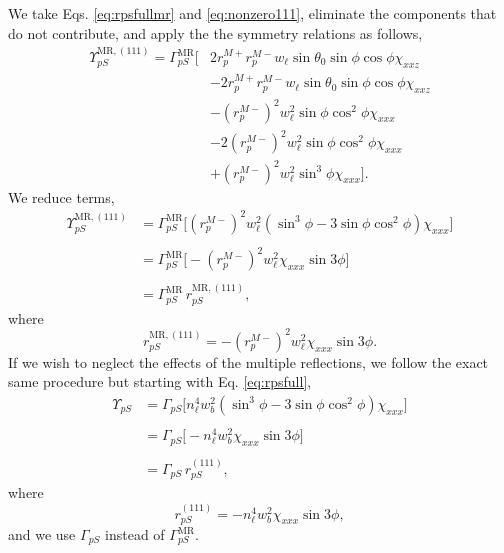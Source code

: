 We take Eqs. \eqref{eq:rpsfullmr} and \eqref{eq:nonzero111}, eliminate the
components that do not contribute, and apply the the symmetry relations as
follows,
\begin{equation*}
\begin{split}
\Upsilon^{\mathrm{MR},(111)}_{pS} = 
\Gamma^{\mathrm{MR}}_{pS}
\big[
&  2r^{M+}_{p}r^{M-}_{p}w_{\ell}\sin\theta_{0}\sin\phi\cos\phi\chi_{xxz}\\
&- 2r^{M+}_{p}r^{M-}_{p}w_{\ell}\sin\theta_{0}\sin\phi\cos\phi\chi_{xxz}\\
&-  \left(r^{M-}_{p}\right)^{2}w^{2}_{\ell}\sin\phi\cos^{2}\phi\chi_{xxx}\\
&- 2\left(r^{M-}_{p}\right)^{2}w^{2}_{\ell}\sin\phi\cos^{2}\phi\chi_{xxx}\\
&+ \left(r^{M-}_{p}\right)^{2}w^{2}_{\ell}\sin^{3}\phi\chi_{xxx}
\big].
\end{split}
\end{equation*}
We reduce terms,
\begin{equation*}
\begin{split}
\Upsilon^{\mathrm{MR},(111)}_{pS} &=
\Gamma^{\mathrm{MR}}_{pS}
\big[
\left(r^{M-}_{p}\right)^{2}w^{2}_{\ell}
      (\sin^{3}\phi - 3\sin\phi\cos^{2}\phi)\chi_{xxx}
\big]\\\\
&=
\Gamma^{\mathrm{MR}}_{pS}
\big[
- \left(r^{M-}_{p}\right)^{2}w^{2}_{\ell}\chi_{xxx}\sin3\phi
\big]\\\\
& = \Gamma^{\mathrm{MR}}_{pS}\,r^{\mathrm{MR},(111)}_{pS},
\end{split}
\end{equation*}
where
\begin{equation}\label{eq:final-rps.mr.111}
r^{\mathrm{MR},(111)}_{pS} = 
- \left(r^{M-}_{p}\right)^{2}w^{2}_{\ell}\chi_{xxx}\sin3\phi.
\end{equation}
If we wish to neglect the effects of the multiple reflections, we follow the
exact same procedure but starting with Eq. \eqref{eq:rpsfull},
\begin{equation}
\begin{split}
\Upsilon_{pS} &= 
\Gamma_{pS}
\big[
n^{4}_{\ell}w^{2}_{b}(\sin^{3}\phi - 3\sin\phi\cos^{2}\phi)\chi_{xxx}
\big]\\\\
&= \Gamma_{pS}
\big[
- n^{4}_{\ell}w^{2}_{b}\chi_{xxx}\sin3\phi
\big]\\\\
&= \Gamma_{pS}\,r^{(111)}_{pS},
\end{split}
\end{equation}
where
\begin{equation}\label{eq:final-rps.111}
r^{(111)}_{pS} = - n^{4}_{\ell}w^{2}_{b}\chi_{xxx}\sin3\phi,
\end{equation}
and we use $\Gamma_{pS}$ instead of $\Gamma^{\mathrm{MR}}_{pS}$.


